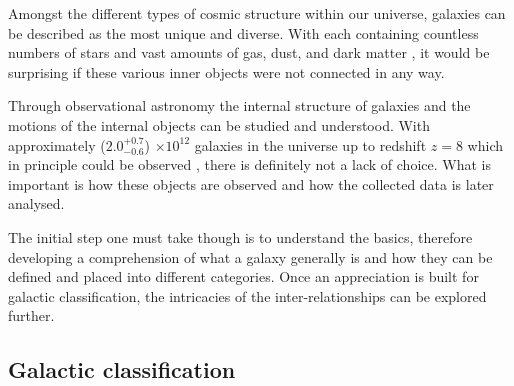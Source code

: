 \documentclass[12pt, twocolumn]{revtex4-1}    %
\begin{document}
Amongst the different types of cosmic structure within our universe, galaxies can be described as the most unique and diverse. With each containing countless numbers of stars and vast amounts of gas, dust, and dark matter \citep{carroll_astro}, it would be surprising if these various inner objects were not connected in any way.

Through observational astronomy the internal structure of galaxies and the motions of the internal objects can be studied and understood. With approximately ($2.0^{+0.7}_{-0.6}$) $\times 10^{12}$ galaxies in the universe up to redshift $z=8$ which in principle could be observed \citep{conselice_galaxynumber}, there is definitely not a lack of choice. What is important is how these objects are observed and how the collected data is later analysed. 




The initial step one must take though is to understand the basics, therefore developing a comprehension of what a galaxy generally is and how they can be defined and placed into different categories. Once an appreciation is built for galactic classification, the intricacies of the inter-relationships can be explored further. 



\subsection*{Galactic classification}
\end{document}
